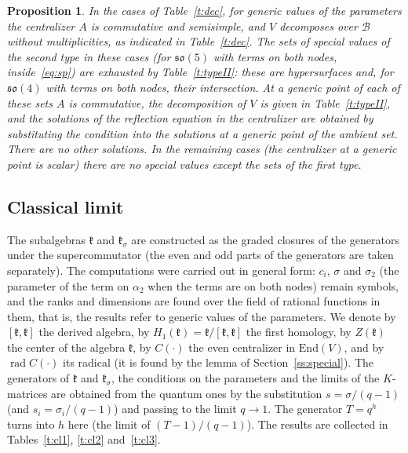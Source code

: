 \documentclass[12pt,a4paper]{article}
\newtheorem{propn}[theorem]{Proposition}
\newcommand{\kk}{\mathfrak{k}}
\newcommand{\so}{\mathfrak{so}}
\begin{document}
\begin{propn}\label{p:typeII}
In the cases of Table~\ref{t:dec}, for generic values of the parameters the centralizer $A$ is commutative and semisimple,
and $V$ decomposes over $\mathcal B$ without multiplicities, as indicated in Table~\ref{t:dec}. The sets of special values of the second
type in these cases (for $\so(5)$ with terms on both nodes, inside~\eqref{eq:sp}) are exhausted by
Table~\ref{t:typeII}: these are hypersurfaces and, for $\so(4)$ with terms on both nodes, their intersection. At a generic
point of each of these sets $A$ is commutative, the decomposition of $V$ is given in Table~\ref{t:typeII}, and the solutions
of the reflection equation in the centralizer are obtained by substituting the condition into the solutions at a generic point of the ambient
set. There are no other solutions. In the remaining cases (the centralizer at a generic point is scalar) there are no special values except
the sets of the first type.
\end{propn}


\subsection{Classical limit}\label{ss:cl}
The subalgebras $\kk$ and $\kk_\sigma$ are constructed as the graded closures of the generators under the supercommutator
(the even and odd parts of the generators are taken separately). The computations were carried out in general form:
$c_i$, $\sigma$ and $\sigma_2$ (the parameter of the term on $\alpha_2$ when the terms are on both nodes) remain symbols, and the ranks
and dimensions are found over the field of rational functions in them, that is, the results refer to generic values of the
parameters. We denote by $[\kk,\kk]$ the derived algebra, by $H_1(\kk)=\kk/[\kk,\kk]$ the first homology,
by $Z(\kk)$ the center of the algebra $\kk$, by $C(\cdot)$ the even centralizer in $\mathrm{End}(V)$, and by
$\operatorname{rad}C(\cdot)$ its radical (it is found by the lemma of Section~\ref{ss:special}). The generators of $\kk$ and
$\kk_\sigma$, the conditions on the parameters and the limits of the $K$-matrices are obtained from the quantum ones by the substitution $s=\sigma/(q-1)$
(and $s_i=\sigma_i/(q-1)$) and passing to the limit $q\to1$. The generator $T=q^{h}$ turns into $h$ here (the limit of
$(T-1)/(q-1)$). The results are collected in Tables~\ref{t:cl1}, \ref{t:cl2} and~\ref{t:cl3}.
\end{document}
